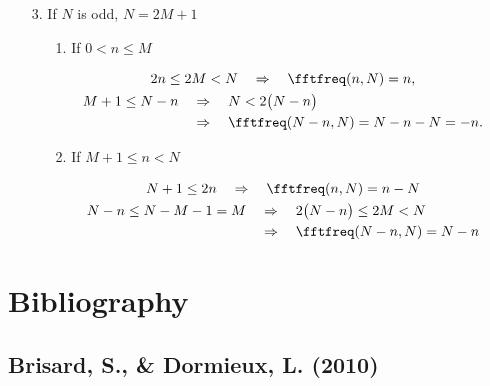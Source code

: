 \documentclass[oneside]{memoir}
\begin{document}
\begin{itemize}
\item[3. ] If \(N\) is odd, \(N=2M+1\)

\begin{itemize}
\item[1. ] If \(0<n\leq M\)

\begin{equation*}
\begin{split}\begin{gather*}
2n\leq 2M<N\quad\Rightarrow\quad \fftfreq(n, N)=n,\\
\begin{aligned}
M+1\leq N-n&\quad\Rightarrow\quad N<2\bigl(N-n\bigr)\\
&\quad\Rightarrow\quad \fftfreq(N-n, N)=N-n-N=-n.
\end{aligned}
\end{gather*}\end{split}\end{equation*}

\item[2. ] If \(M+1\leq n<N\)

\begin{equation*}
\begin{split}\begin{gather*}
N+1\leq 2n\quad\Rightarrow\quad \fftfreq(n, N)=n-N\\
\begin{aligned}
N-n\leq N-M-1=M&\quad\Rightarrow\quad 2\bigl(N-n\bigr)\leq 2M<N\\
&\quad\Rightarrow\quad \fftfreq(N-n, N)=N-n
\end{aligned}
\end{gather*}\end{split}\end{equation*}
\end{itemize}
\end{itemize}


\hypertarget{7261367053393854382}{}


\chapter{Bibliography}



\hypertarget{16002782079292950992}{}


\section{Brisard, S., \& Dormieux, L. (2010)}
\end{document}
